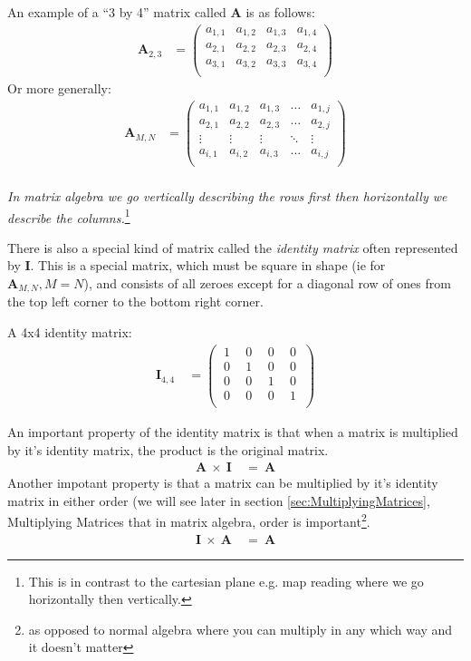 An example of a ``3 by 4'' matrix called $\mathbf{A}$ is as follows:
\begin{align}
\mathbf{A}_{2,3} & = 
\begin{pmatrix}
  a_{1,1}   &   a_{1,2}   &   a_{1,3}   &   a_{1,4}   \\
  a_{2,1}   &   a_{2,2}   &   a_{2,3}   &   a_{2,4}   \\
  a_{3,1}   &   a_{3,2}   &   a_{3,3}   &   a_{3,4}   \\
\end{pmatrix}
\end{align}
Or more generally:
\begin{align}
\mathbf{A}_{M,N} & = 
\begin{pmatrix}
  a_{1,1}   &   a_{1,2}   &   a_{1,3}   &   \ldots   &   a_{1,j}   \\
  a_{2,1}   &   a_{2,2}   &   a_{2,3}   &   \ldots   &   a_{2,j}   \\
  \vdots    &   \vdots    &   \vdots    &   \ddots   &   \vdots    \\
  a_{i,1}   &   a_{i,2}   &   a_{i,3}   &   \ldots   &   a_{i,j}   \\
\end{pmatrix}
\label{eq:FormOfMatrices}
\end{align}
\\
\emph{In matrix algebra we go vertically describing the rows first then
horizontally we describe the columns.}\footnote{This is in contrast to the
cartesian plane e.g. map reading where we go horizontally then vertically.}

There is also a special kind of matrix called the \emph{identity matrix} often
represented by $\mathbf{I}$. This is a special matrix, which must be square in
shape (ie for $\mathbf{A}_{M,N}, M = N$), and consists of all zeroes except for
a diagonal row of ones from the top left corner to the bottom right corner.

A 4x4 identity matrix:
\begin{align}
  \mathbf{I}_{4,4}~&=
  \begin{pmatrix}
    ~1~&~0~&~0~&~0~\\
    ~0~&~1~&~0~&~0~\\
    ~0~&~0~&~1~&~0~\\
    ~0~&~0~&~0~&~1~\\
  \end{pmatrix}
  \label{eq:4x4IdentityMatrix}
\end{align}

An important property of the identity matrix is that when a matrix is multiplied
by it's identity matrix, the product is the original matrix.
\begin{align}
  \mathbf{A}~\times~\mathbf{I}~&=~\mathbf{A}
\end{align}
Another impotant property is that a matrix can be multiplied by it's identity
matrix in either order (we will see later in section
\ref{sec:MultiplyingMatrices}, Multiplying Matrices that in matrix
algebra, order is important\footnote{as opposed to normal algebra where you can
multiply in any which way and it doesn't matter}.
\begin{align}
  \mathbf{I}~\times~\mathbf{A}~&=~\mathbf{A}
\end{align}

